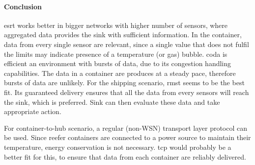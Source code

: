 \paragraph{Conclusion}
\acrshort{esrt} works better in bigger networks with higher number of sensors, where aggregated data provides the sink with sufficient information. In the container, data from every single sensor are relevant, since a single value that does not fulfil the limits may indicate presence of a temperature (or gas) bubble. \acrshort{coda} is efficient an environment with bursts of data, due to its congestion handling capabilities. The data in a container are produces at a steady pace, therefore bursts of data are unlikely. For the shipping scenario, \acrshort{rmst} seems to be the best fit. Its guaranteed delivery ensures that all the data from every sensors will reach the sink, which is preferred. Sink can then evaluate these data and take appropriate action.

For container-to-hub scenario, a regular (non-WSN) transport layer protocol can be used. Since reefer containers are connected to a power source to maintain their temperature, energy conservation is not necessary. \acrshort{tcp} would probably be a better fit for this, to ensure that data from each container are reliably delivered.